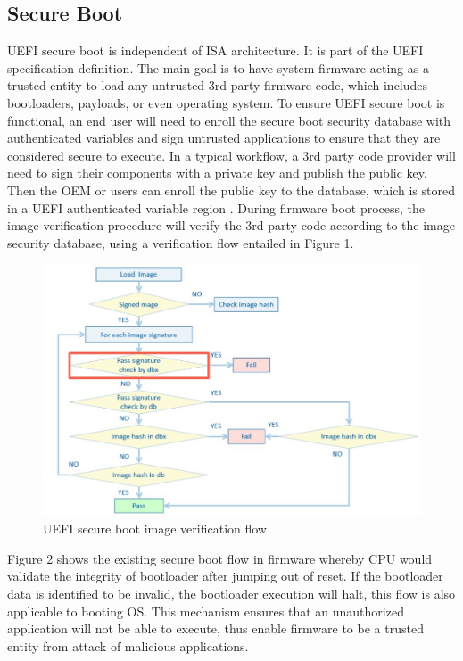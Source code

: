 \documentclass[]{rsos}%
\begin{document}
\subsection{Secure Boot}
UEFI secure boot is independent of ISA architecture. It is part of the UEFI specification definition. The main goal is to have system firmware acting as a trusted entity to load any untrusted 3rd party firmware code, which includes bootloaders, payloads, or even operating system. To ensure UEFI secure boot is functional, an end user will need to enroll the secure boot security database with authenticated variables and sign untrusted applications to ensure that they are considered secure to execute.
In a typical workflow, a 3rd party code provider will need to sign their components with a private key and publish the public key. Then the OEM or users can enroll the public key to the database, which is stored in a UEFI authenticated variable region \cite{R5:13}.  During firmware boot process, the image verification procedure will verify the 3rd party code according to the image security database, using a verification flow entailed in Figure 1.


\begin{figure}[H]
	\centering
	\includegraphics[width=1\textwidth]{figs/UefiSecureBootImageVerificationFlow.JPG}
	\caption{UEFI secure boot image verification flow \cite{R5:13}}
\end{figure}

Figure 2 shows the existing secure boot flow in firmware whereby CPU would validate the integrity of bootloader after jumping out of reset. If the bootloader data is identified to be invalid, the bootloader execution will halt, this flow is also applicable to booting OS. This mechanism ensures that an unauthorized application will not be able to execute, thus enable firmware to be a trusted entity from attack of malicious applications. 
\end{document}
